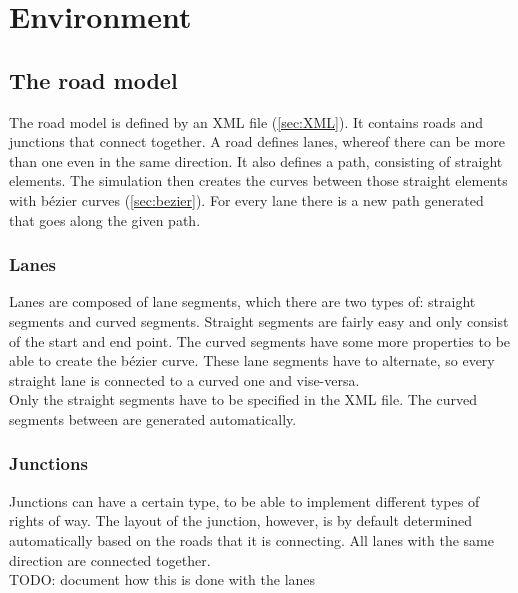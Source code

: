 
\section{Environment}
\label{sec:environment}

\subsection{The road model}
\label{sec:roadModel}

The road model is defined by an XML file (\ref{sec:XML}). It contains roads and
junctions that connect together. A road defines lanes, whereof
there can be more than one even in the same direction. It also defines
a path, consisting of straight elements. The simulation then creates the 
curves between those straight elements with bézier curves (\ref{sec:bezier}).
For every lane there is a new path generated that goes along the given path.


\subsubsection{Lanes}
\label{sec:lanes}

Lanes are composed of lane segments, which there are two types of:
straight segments and curved segments. Straight segments are fairly
easy and only consist of the start and end point. The curved segments
have some more properties to be able to create the bézier curve. 
These lane segments have to alternate, so every straight lane is connected
to a curved one and vise-versa. \\

\noindent Only the straight segments have to be specified in the XML file. 
The curved segments between are generated automatically.


\subsubsection{Junctions}
\label{sec:junctions}

Junctions can have a certain type, to be able to implement different types
of rights of way. The layout of the junction, however, is by default 
determined automatically based on the roads that it is connecting. All 
lanes with the same direction are connected together. \\

TODO: document how this is done with the lanes

